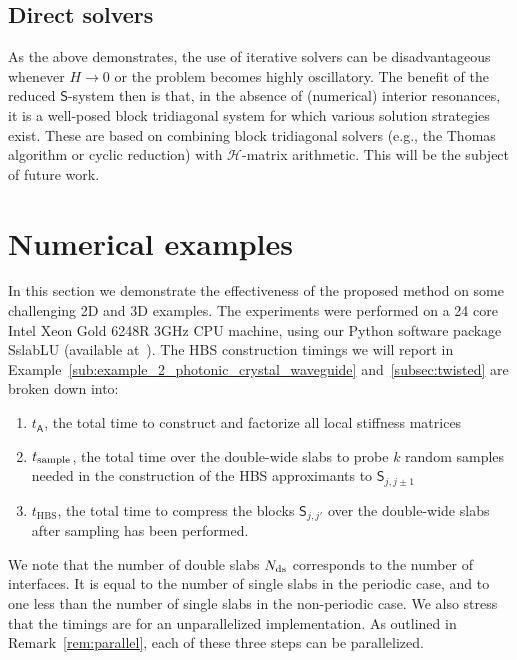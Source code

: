 \documentclass[final,onefignum,onetabnum]{siamart250211}
\newcommand{\mtx}[1]{\bm{\mathsf{#1}}}
\theoremstyle{definition}
\begin{document}
\subsection{Direct solvers}\label{subsec:directSolve}
As the above demonstrates, the use of iterative solvers can be disadvantageous whenever $H\rightarrow 0$ or the problem becomes highly oscillatory. The benefit of the reduced $\mtx{S}$-system then is that, in the absence of (numerical) interior resonances, it is a well-posed block tridiagonal system for which various solution strategies exist. These are based on combining block tridiagonal solvers (e.g., the Thomas algorithm or cyclic reduction) with $\mathcal{H}$-matrix arithmetic. This will be the subject of future work.
\section{Numerical examples}\label{sec:numerical}
In this section we demonstrate the effectiveness of the proposed method on some challenging 2D and 3D examples. The experiments were performed on a 24 core Intel Xeon Gold 6248R 3GHz CPU machine, using our Python software package SslabLU (available at~\cite{SslabLU}).
The HBS construction timings we will report in Example~\ref{sub:example_2_photonic_crystal_waveguide} and~\ref{subsec:twisted} are broken down into:
\begin{enumerate}
    \item $t_{\mtx{A}}$, the total time to construct and factorize all local stiffness matrices
    \item $t_{\rm sample}$, the total time over the double-wide slabs to probe $k$ random samples needed in the construction of the HBS approximants to $\mtx{S}_{j,j\pm1}$
    \item $t_{\text{HBS}}$, the total time to compress the blocks $\mtx{S}_{j,j'}$ over the double-wide slabs after sampling has been performed.
\end{enumerate}
We note that the number of double slabs $N_{\rm ds}$ corresponds to the number of interfaces. It is equal to the number of single slabs in the periodic case, and to one less than the number of single slabs in the non-periodic case. We also stress that the timings are for an unparallelized implementation. As outlined in Remark~\ref{rem:parallel}, each of these three steps can be parallelized.
\end{document}
